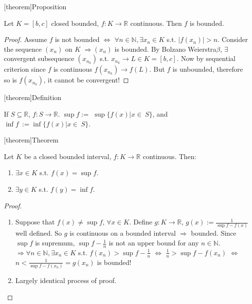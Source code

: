 \documentclass[12pt]{report}
\theoremstyle{definition}
\begin{document}
[theorem]{Proposition}
\begin{sequence is bounded in closed bounded continuous func}
    Let $K = [b,c]$ closed bounded, $f:K\rightarrow{}\mathbb{R}$ continuous.
    Then $f$ is bounded.
\end{sequence is bounded in closed bounded continuous func}

\begin{proof}
    Assume $f$ is not bounded $\iff$
    $\forall n \in \mathbb{N}, \exists x_n \in K$ s.t. $|f(x_n)|>n$.
    Consider the sequence $(x_n)$ on $K$ $\Rightarrow{}(x_n)$ is bounded.
    By Bolzano Weierstra$\beta$, $\exists$ convergent subsequence $(x_{n_k})$
    s.t. $x_{n_k} \rightarrow{} L \in K = [b,c]$.
    Now by sequential criterion since $f$ is continuous $f(x_{n_k}) \rightarrow{}f(L)$.
    But $f$ is unbounded, therefore so is $f(x_{n_k})$, it cannot be convergent!
\end{proof}

[theorem]{Definition}
\begin{supremum of function}
    If $S \subseteq \mathbb{R}$, $f:S\rightarrow{}\mathbb{R}$.
    $\sup{f} :=$ $ \sup{\{f(x) | x \in\ S\}}$,
    and $\inf{f}\ := \inf{\{ f(x) | x \in\ S\}}$.
\end{supremum of function}

[theorem]{Theorem}
\begin{closed bounded interval func has sup}
    Let $K$ be a closed bounded interval, $f:K\rightarrow{}\mathbb{R}$ continuous. Then:
    \begin{enumerate}[label = (\arabic*)]
        \item $\exists x \in K$ s.t. $f(x) = \sup{f}$.
        \item $\exists y \in K$ s.t. $f(y) = \inf{f}$.
    \end{enumerate}
    
\end{closed bounded interval func has sup}

\begin{proof}
   \begin{enumerate}[label = (\arabic*)]
       \item Suppose that $f(x) \neq \sup{f}$, $\forall x \in K$.
           Define $g:K\rightarrow{}\mathbb{R}$, $g(x) := \frac{1}{\sup{f} - f(x)}$ well defined.
           So $g$ is continuous on a bounded interval $\Rightarrow{}$ bounded.
           Since $\sup{f}$ is supremum, $\sup{f} - \frac{1}{n}$ 
           is not an upper bound for any $n \in \mathbb{N}$.
           $\Rightarrow{} \forall n \in \mathbb{N}, \exists x_n \in K$ s.t. 
           $f(x_n) > \sup{f} - \frac{1}{n}$ $\iff$
           $\frac{1}{n}>\sup{f} - f(x_n)$ $\iff$
           $n < \frac{1}{\sup{f} - f(x_n)} = g(x_n)$ is bounded!

       \item Largely identical process of proof.
   \end{enumerate}
   
\end{proof}
\end{document}
